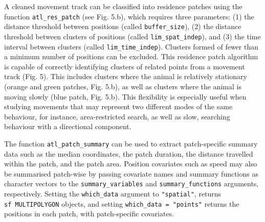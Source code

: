 \documentclass[10pt,paper=a4,headings=standardclasses
]{scrartcl}
\begin{document}
A cleaned movement track can be classified into residence patches using the function \texttt{atl\_res\_patch} (see Fig. 5.b), which requires three parameters: (1) the distance threshold between positions (called \texttt{buffer\_size}), (2) the distance threshold between clusters of positions (called \texttt{lim\_spat\_indep}), and (3) the time interval between clusters (called \texttt{lim\_time\_indep}).
Clusters formed of fewer than a minimum number of positions can be excluded.
This residence patch algorithm is capable of correctly identifying clusters of related points from a movement track (Fig. 5).
This includes clusters where the animal is relatively stationary (orange and green patches, Fig. 5.b), as well as clusters where the animal is moving slowly (blue patch, Fig. 5.b).
This flexibility is especially useful when studying movements that may represent two different modes of the same behaviour, for instance, area-restricted search, as well as slow, searching behaviour with a directional component.

The function \texttt{atl\_patch\_summary} can be used to extract patch-specific summary data such as the median coordinates, the patch duration, the distance travelled within the patch, and the patch area.
Position covariates such as speed may also be summarised patch-wise by passing covariate names and  summary functions as character vectors to the \texttt{summary\_variables} and \texttt{summary\_functions} arguments, respectively.
Setting the \texttt{which\_data} argument to \texttt{"spatial"}, returns \texttt{sf\ MULTIPOLYGON} objects, and setting \texttt{which\_data = "points"} returns the positions in each patch, with patch-specific covariates.
\end{document}
